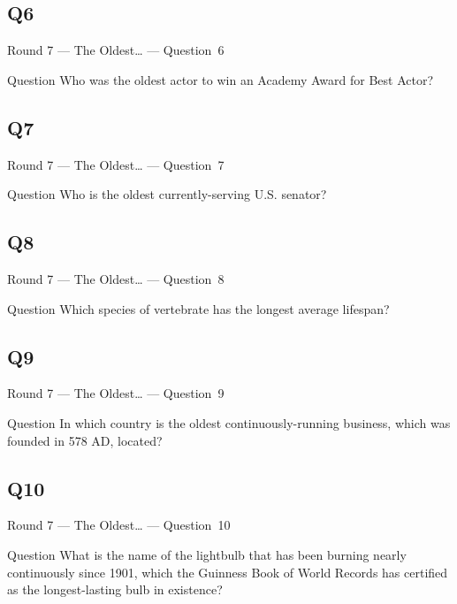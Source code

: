 \documentclass[11pt]{beamer}
\begin{document}
\subsection*{Q6}
\begin{frame}[t]{Round 7 --- The Oldest… --- \mbox{Question 6}}
\vspace{-0.5em}
\begin{block}{Question}
Who was the oldest actor to win an Academy Award for Best Actor?
\end{block}
\end{frame}
\subsection*{Q7}
\begin{frame}[t]{Round 7 --- The Oldest… --- \mbox{Question 7}}
\vspace{-0.5em}
\begin{block}{Question}
Who is the oldest currently-serving U.S. senator?
\end{block}
\end{frame}
\subsection*{Q8}
\begin{frame}[t]{Round 7 --- The Oldest… --- \mbox{Question 8}}
\vspace{-0.5em}
\begin{block}{Question}
Which species of vertebrate has the longest average lifespan?
\end{block}
\end{frame}
\subsection*{Q9}
\begin{frame}[t]{Round 7 --- The Oldest… --- \mbox{Question 9}}
\vspace{-0.5em}
\begin{block}{Question}
In which country is the oldest continuously-running business, which was founded in 578 AD, located?
\end{block}
\end{frame}
\subsection*{Q10}
\begin{frame}[t]{Round 7 --- The Oldest… --- \mbox{Question 10}}
\vspace{-0.5em}
\begin{block}{Question}
What is the name of the lightbulb that has been burning nearly continuously since 1901, which the Guinness Book of World Records has certified as the longest-lasting bulb in existence?
\end{block}
\end{frame}
\end{document}
